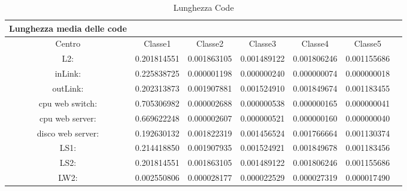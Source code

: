 \begin{table}[htbp]
\begin{center}
\begin{tabular}{||c|c|c|c|c|c|c||}
\hline
Lunghezza media delle code\\
\hline
Centro &Classe1 &Classe2 &Classe3 &Classe4 &Classe5\\
\hline
\hline
L2: &0.201814551 &0.001863105 &0.001489122 &0.001806246 &0.001155686\\
\hline
inLink: &0.225838725 &0.000001198 &0.000000240 &0.000000074 &0.000000018\\
\hline
outLink: &0.202313873 &0.001907881 &0.001524910 &0.001849674 &0.001183455\\
\hline
cpu web switch: &0.705306982 &0.000002688 &0.000000538 &0.000000165 &0.000000041\\
\hline
cpu web server: &0.669622248 &0.000002607 &0.000000521 &0.000000160 &0.000000040\\
\hline
disco web server: &0.192630132 &0.001822319 &0.001456524 &0.001766664 &0.001130374\\
\hline
LS1: &0.214418850 &0.001907935 &0.001524921 &0.001849678 &0.001183456\\
\hline
LS2: &0.201814551 &0.001863105 &0.001489122 &0.001806246 &0.001155686\\
\hline
LW2: &0.002550806 &0.000028177 &0.000022529 &0.000027319 &0.000017490\\
\hline
\end{tabular}
\end{center}
\caption{Lunghezza Code}
\label{lunghezzacode}
\end{table}

